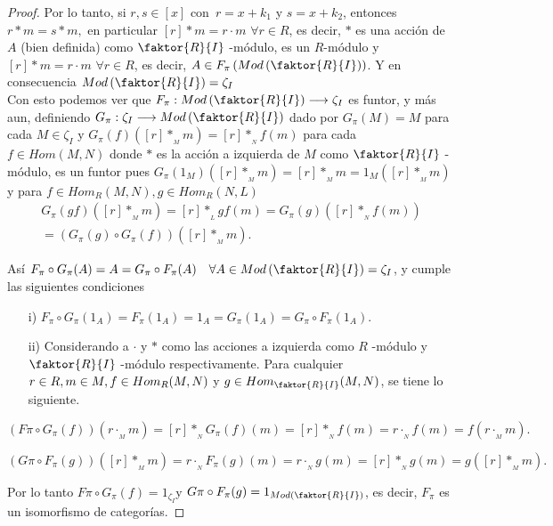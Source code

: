 \documentclass{article}
\theoremstyle{definition}
\theoremstyle{plain}
\theoremstyle{plain}
\theoremstyle{definition}
\theoremstyle{definition}
\theoremstyle{definition}
\theoremstyle{definition}
\theoremstyle{definition}
\theoremstyle{definition}
\begin{document}
\begin{enumerate}[label=\textbf{Ej \arabic*.}]
\begin{proof}
Por lo tanto, si $r,s\in [x]$ con $\, r=x+k_1$ y $s=x+k_2$, entonces $r*m=s*m,$ en particular $[r]*m=r\cdot m\,\,\forall r\in R$, es decir,
$*$ es una acción de $A$ (bien definida) como $\faktor{R}{I}$ -módulo, es un $R$-módulo y $[r]*m=r\cdot m\,\,\forall r\in R$,
es decir, $A\in F_\pi\left(Mod\left(\faktor{R}{I}\right)\right)$. Y en consecuencia $Mod\left(\faktor{R}{I}\right)=\zeta_I$\\

Con esto podemos ver que $F_\pi:Mod\left(\faktor{R}{I}\right)\longrightarrow\zeta_I$ es funtor, y más aun, definiendo 
$G_\pi:\zeta_I\longrightarrow Mod\left(\faktor{R}{I}\right)$ dado por $G_\pi(M)=M$ para cada $M\in \zeta_I$ y $G_\pi(f)([r]*_{{}_M} m)
 =[r]*_{{}_N}f(m)$ para cada $f\in Hom(M,N)$ donde $*$ es la acción a izquierda de $M$ como $\faktor{R}{I}$ -módulo,
es un funtor pues $G_\pi(1_M)([r]*_{{}_M}m)=[r]*_{{}_M}m=1_M([r]*_{{}_M}m)$ y para $ f\in Hom_R(M,N), g\in Hom_R(N,L)$
\begin{gather*}
 G_\pi(gf)([r]*_{{}_M}m)=[r]*_{{}_L}gf(m)=G_\pi(g)\left([r]*_{{}_N}f(m)\right)\\
 =\left(G_\pi(g)\circ G_\pi(f)\right)([r]*_{{}_M}m).
\end{gather*}

Así $F_\pi\circ G_\pi(A)=A=G_\pi\circ F_\pi(A)\quad \forall A\in Mod\left(\faktor{R}{I}\right)=\zeta_I$, y cumple las siguientes condiciones
\begin{itemize}
\item[i)] $F_\pi\circ G_\pi(1_A)=F_\pi(1_A)=1_A=G_\pi(1_A)=G_\pi\circ F_\pi(1_A)$.

\item[ii)] Considerando a $\cdot$ y $*$ como las acciones a izquierda como $R$ -módulo y $\faktor{R}{I}$ -módulo respectivamente.
Para cualquier $r\in R, m\in M,\\ f\in Hom_R(M,N)$ y $g\in Hom_{\faktor{R}{I}}(M,N)$, se tiene lo siguiente.
\end{itemize}
\[\left(F\pi\circ G_\pi(f)\right)(r\cdot_{{}_M}m)=[r] *_{{}_N} G_\pi(f)(m)=[r] *_{{}_N}f(m)=r\cdot_{{}_N}f(m)=f(r\cdot_{{}_M}m).\]

\[\left(G\pi\circ F_\pi(g)\right)([r]*_{{}_M}m)=r \cdot_{{}_N} F_\pi(g)(m)=r\cdot_{{}_N}g(m)=[r]*_{{}_N}g(m)=g([r]*_{{}_M}m).\]

Por lo tanto $F\pi\circ G_\pi(f)=1_{\zeta_I}$\quad y \quad $G\pi\circ F_\pi(g)=1_{Mod\left(\faktor{R}{I}\right)}$, es decir, $F_\pi$ es
un isomorfismo de categorías.

\end{proof}



\end{enumerate}
\end{document}
